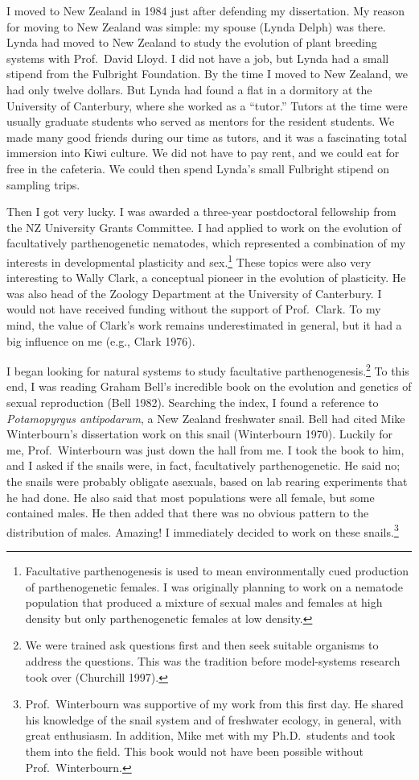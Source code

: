 \documentclass[
  letterpaper,
]{book}
\begin{document}
I moved to New Zealand in 1984 just after defending my dissertation. My
reason for moving to New Zealand was simple: my spouse (Lynda Delph) was
there. Lynda had moved to New Zealand to study the evolution of plant
breeding systems with Prof.~David Lloyd. I did not have a job, but Lynda
had a small stipend from the Fulbright Foundation. By the time I moved
to New Zealand, we had only twelve dollars. But Lynda had found a flat
in a dormitory at the University of Canterbury, where she worked as a
``tutor.'' Tutors at the time were usually graduate students who served
as mentors for the resident students. We made many good friends during
our time as tutors, and it was a fascinating total immersion into Kiwi
culture. We did not have to pay rent, and we could eat for free in the
cafeteria. We could then spend Lynda's small Fulbright stipend on
sampling trips.

Then I got very lucky. I was awarded a three-year postdoctoral
fellowship from the NZ University Grants Committee. I had applied to
work on the evolution of facultatively parthenogenetic nematodes, which
represented a combination of my interests in developmental plasticity
and sex.\footnote{Facultative parthenogenesis is used to mean
  environmentally cued production of parthenogenetic females. I was
  originally planning to work on a nematode population that produced a
  mixture of sexual males and females at high density but only
  parthenogenetic females at low density.} These topics were also very
interesting to Wally Clark, a conceptual pioneer in the evolution of
plasticity. He was also head of the Zoology Department at the University
of Canterbury. I would not have received funding without the support of
Prof.~Clark. To my mind, the value of Clark's work remains
underestimated in general, but it had a big influence on me (e.g., Clark
1976).

I began looking for natural systems to study facultative
parthenogenesis.\footnote{We were trained ask questions first and then
  seek suitable organisms to address the questions. This was the
  tradition before model-systems research took over (Churchill 1997).}
To this end, I was reading Graham Bell's incredible book on the
evolution and genetics of sexual reproduction (Bell 1982). Searching the
index, I found a reference to \emph{Potamopyrgus antipodarum}, a New
Zealand freshwater snail. Bell had cited Mike Winterbourn's dissertation
work on this snail (Winterbourn 1970). Luckily for me, Prof.~Winterbourn
was just down the hall from me. I took the book to him, and I asked if
the snails were, in fact, facultatively parthenogenetic. He said no; the
snails were probably obligate asexuals, based on lab rearing experiments
that he had done. He also said that most populations were all female,
but some contained males. He then added that there was no obvious
pattern to the distribution of males. Amazing! I immediately decided to
work on these snails.\footnote{Prof.~Winterbourn was supportive of my
  work from this first day. He shared his knowledge of the snail system
  and of freshwater ecology, in general, with great enthusiasm. In
  addition, Mike met with my Ph.D.~students and took them into the
  field. This book would not have been possible without
  Prof.~Winterbourn.}
\end{document}
